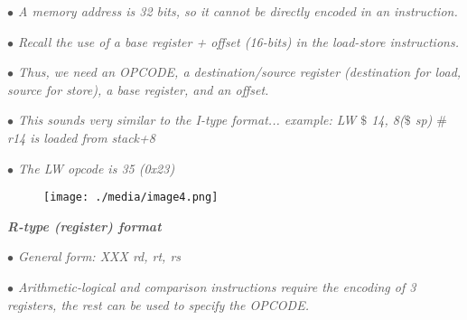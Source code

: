 \documentclass[12pt]{article}
\begin{document}
 \tab \textit{\textcolor[HTML]{525252}{$\bullet$  A memory address is 32 bits, so it cannot be directly encoded in an instruction. }}\par

\textit{\textcolor[HTML]{525252}{$\bullet$  Recall the use of a base register + offset (16-bits) in the load-store instructions. }}\par

\begin{adjustwidth}{0.5in}{0.0in}
\textit{\textcolor[HTML]{525252}{$\bullet$  Thus, we need an OPCODE, a destination/source register (destination for load, source for store), a base register, and an offset.}}\par

\end{adjustwidth}

\begin{adjustwidth}{0.5in}{0.0in}
\textit{\textcolor[HTML]{525252}{$\bullet$  This sounds very similar to the I-type format... example: LW $\$$ 14, 8($\$$ sp) $\#$  r14 is loaded from stack+8 }}\par

\end{adjustwidth}

\textit{\textcolor[HTML]{525252}{$\bullet$  The LW opcode is 35 (0x23)}}\par




\begin{figure}[H]
	\begin{Center}
		\texttt{[image: ./media/image4.png]}
	\end{Center}
\end{figure}



\par

{\fontsize{14pt}{16.8pt}\selectfont \textbf{\textit{\textcolor[HTML]{525252}{R-type (register) format }}}\par}\par

\textit{\textcolor[HTML]{525252}{$\bullet$  General form: XXX rd, rt, rs }}\par

\begin{adjustwidth}{0.5in}{0.0in}
\textit{\textcolor[HTML]{525252}{$\bullet$  Arithmetic-logical and comparison instructions require the encoding of 3 registers, the rest can be used to specify the OPCODE. }}\par

\end{adjustwidth}
\end{document}
